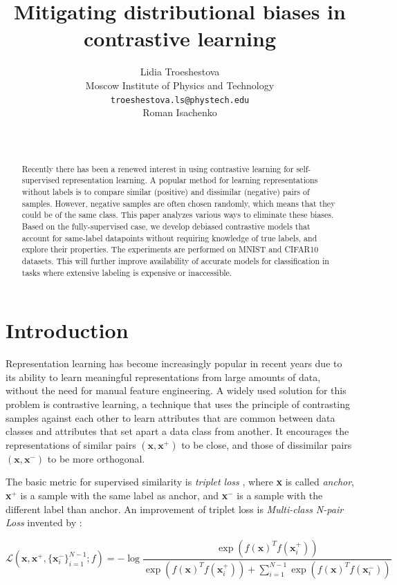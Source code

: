 \documentclass{article}
\title{Mitigating distributional biases in contrastive learning}
\author{ Lidia Troeshestova \\
	Moscow Institute of Physics and Technology\\
	\texttt{troeshestova.ls@phystech.edu} \\
	\And
	Roman Isachenko\\
	   \\
	\texttt{} \\
}
\date{}
\begin{document}
\nocite{*}
\maketitle

\begin{abstract}
	Recently there has been a renewed interest in using contrastive learning for self-supervised representation learning. A popular method for learning representations without labels is to compare similar (positive) and dissimilar (negative) pairs of samples. However, negative samples are often chosen randomly, which means that they could be of the same class. This paper analyzes various ways to eliminate these biases. Based on the fully-supervised case, we develop debiased contrastive models that account for same-label datapoints without requiring knowledge of true labels, and explore their properties. The experiments are performed on MNIST and CIFAR10 datasets. This will further improve availability of accurate models for classification in tasks where extensive labeling is expensive or inaccessible.
\end{abstract}



\section{Introduction}
Representation learning has become increasingly popular in recent years due to its ability to learn meaningful representations from large amounts of data, without the need for manual feature engineering. A widely used solution for this problem is contrastive learning, a technique that uses the principle of contrasting samples against each other to learn attributes that are common between data classes and attributes that set apart a data class from another. It encourages the representations of similar pairs $(\textbf{x}, \textbf{x}^+)$ to be close, and those of dissimilar pairs $(\textbf{x}, \textbf{x}^-)$ to be more orthogonal.

The basic metric for supervised similarity is \textit{triplet loss} \citep{schroff2015facenet}, where \textbf{x} is called \textit{anchor}, \textbf{x}$^+$ is a sample with the same label as anchor, and \textbf{x}$^-$ is a sample with the different label than anchor. An improvement of triplet loss is \textit{Multi-class N-pair Loss} invented by \citep{NIPS2016_6b180037}:

\begin{equation} \label{eq:1}
\mathcal{L}(\textbf{x}, \textbf{x}^+, \{\textbf{x}_i^-\}_{i=1}^{N-1}; f) = - \log \frac{\exp(f(\textbf{x})^T f(\textbf{x}_i^+))}{\exp(f(\textbf{x})^T f(\textbf{x}_i^+)) + \sum _{i=1}^{N-1} \exp(f(\textbf{x})^Tf(\textbf{x}_i^-))}
\end{equation}
\end{document}
